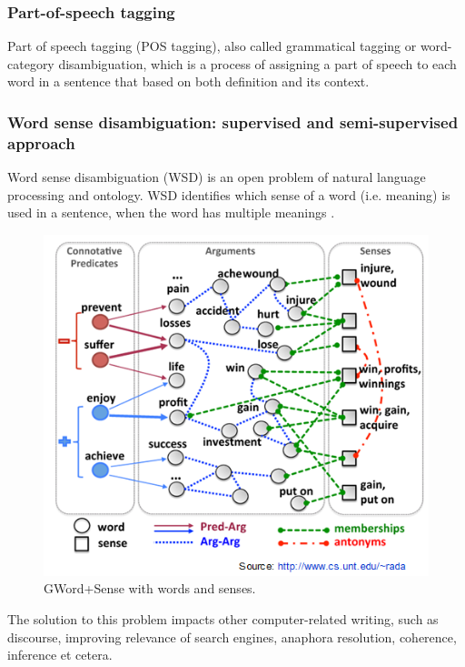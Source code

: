 \subsubsection*{Part-of-speech tagging}

Part of speech tagging (POS tagging), also called grammatical tagging or word-category disambiguation, which is a process of assigning a part of speech to each word in a sentence that based on both definition and its context.\\

\subsubsection*{Word sense disambiguation: supervised and semi-supervised approach}

Word sense disambiguation (WSD) is an open problem of natural language processing and ontology. 
WSD identifies which sense of a word (i.e. meaning) is used in a sentence, when the word has multiple meanings \cite{Du2013}. 

\begin{figure}[tbh]
	\begin{center}
		\includegraphics[width=\columnwidth]{Union_Background_Chart_WSD}
	\end{center}
	\caption{GWord+Sense with words and senses. \label{fig1}}
\end{figure}

The solution to this problem impacts other computer-related writing, such as discourse, improving relevance of search engines, anaphora resolution, coherence, inference et cetera.

